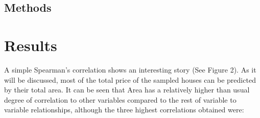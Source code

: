 \documentclass[journal]{IEEEtran}
\begin{document}
\begin{enumerate}
\begin{itemize}
\begin{table}[htb]
\caption{Summary of the newly created variables.}
\label{1234}
\end{table}




\end{itemize}

\end{enumerate}

\subsection{Methods}


\section{Results}

A simple Spearman’s correlation shows an interesting story (See Figure 2). As it will be discussed, most of the total price of the sampled
houses can be predicted by their total area. It can be seen that Area has a relatively higher than usual degree of correlation to other variables compared to the rest of variable to variable relationships,
although the three highest correlations obtained were:
\end{document}
